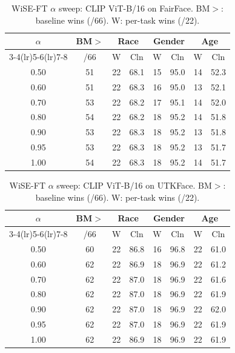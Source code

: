 \begin{table}[htbp]
\caption{WiSE-FT $\alpha$ sweep: CLIP ViT-B/16 on FairFace. BM$>$: baseline wins (/66). W: per-task wins (/22).}
\label{tab:sweep_clip_ff}
\centering\small
\setlength{\tabcolsep}{3.5pt}
\begin{tabular}{c c cc cc cc}
\toprule
$\alpha$ & BM$>$ & \multicolumn{2}{c}{Race} & \multicolumn{2}{c}{Gender} & \multicolumn{2}{c}{Age} \\
\cmidrule(lr){3-4}\cmidrule(lr){5-6}\cmidrule(lr){7-8}
 & /66 & W & Cln & W & Cln & W & Cln \\
\midrule
0.50 & 51 & 22 & 68.1 & 15 & 95.0 & 14 & 52.3 \\
0.60 & 51 & 22 & 68.3 & 16 & 95.0 & 13 & 52.1 \\
0.70 & 53 & 22 & 68.2 & 17 & 95.1 & 14 & 52.0 \\
0.80 & 54 & 22 & 68.2 & 18 & 95.2 & 14 & 51.8 \\
0.90 & 53 & 22 & 68.3 & 18 & 95.2 & 13 & 51.8 \\
0.95 & 53 & 22 & 68.3 & 18 & 95.2 & 13 & 51.7 \\
1.00 & 54 & 22 & 68.3 & 18 & 95.2 & 14 & 51.7 \\
\bottomrule
\end{tabular}
\end{table}


\begin{table}[htbp]
\caption{WiSE-FT $\alpha$ sweep: CLIP ViT-B/16 on UTKFace. BM$>$: baseline wins (/66). W: per-task wins (/22).}
\label{tab:sweep_clip_utk}
\centering\small
\setlength{\tabcolsep}{3.5pt}
\begin{tabular}{c c cc cc cc}
\toprule
$\alpha$ & BM$>$ & \multicolumn{2}{c}{Race} & \multicolumn{2}{c}{Gender} & \multicolumn{2}{c}{Age} \\
\cmidrule(lr){3-4}\cmidrule(lr){5-6}\cmidrule(lr){7-8}
 & /66 & W & Cln & W & Cln & W & Cln \\
\midrule
0.50 & 60 & 22 & 86.8 & 16 & 96.8 & 22 & 61.0 \\
0.60 & 62 & 22 & 86.9 & 18 & 96.9 & 22 & 61.2 \\
0.70 & 62 & 22 & 87.0 & 18 & 96.9 & 22 & 61.6 \\
0.80 & 62 & 22 & 87.0 & 18 & 96.9 & 22 & 61.9 \\
0.90 & 62 & 22 & 87.0 & 18 & 96.9 & 22 & 62.0 \\
0.95 & 62 & 22 & 87.0 & 18 & 96.9 & 22 & 61.9 \\
1.00 & 62 & 22 & 86.9 & 18 & 96.9 & 22 & 61.9 \\
\bottomrule
\end{tabular}
\end{table}


